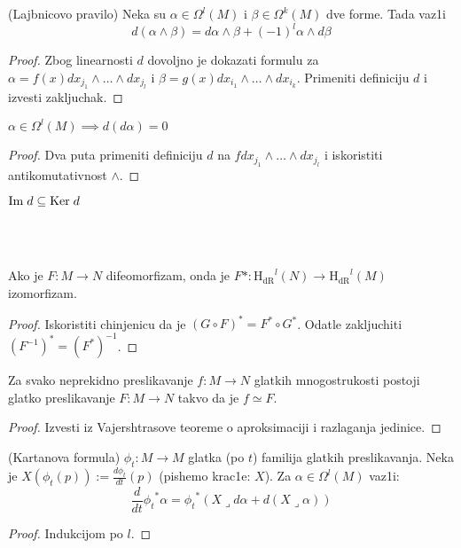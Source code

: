 \documentclass[a4paper,12pt]{article}
\newcommand{\psj}{\subseteq}
\newcommand{\hdr}[1]{{\mathrm{H_{dR}}}^{#1}}
\begin{document}
\begin{tvr} (Lajbnicovo pravilo)
Neka su $\alpha \in \Omega^l(M)$ i $\beta \in \Omega^k(M)$ dve forme. Tada vaz1i 
\[d(\alpha \wedge \beta) = d \alpha \wedge \beta + (-1)^l \alpha \wedge d \beta \]
\end{tvr}
\begin{proof}
Zbog linearnosti $d$ dovoljno je dokazati formulu za $\alpha = f(x) dx_{j_1} \wedge \dots \wedge dx_{j_l}$ i $\beta = g(x) dx_{i_1} \wedge \dots \wedge dx_{i_k}$. Primeniti definiciju $d$ i izvesti zakljuchak.
\end{proof}

\begin{tma} 
$\alpha \in \Omega^l(M) \implies d(d \alpha) = 0$
\end{tma}

\begin{proof}
Dva puta primeniti definiciju $d$ na $f dx_{j_1}\wedge \dots \wedge dx_{j_l} $ i iskoristiti anti\-ko\-mu\-ta\-tiv\-nost $\wedge$.
\end{proof}

\begin{posl}
$\mathrm{Im} \hspace{0.1cm} d \psj \mathrm{Ker} \hspace{0.1cm} d$
\end{posl}
\\ \\
\begin{tvr}
Ako je $F: M \to N$ difeomorfizam, onda je $F* : \hdr{l} (N) \to \hdr{l} (M)$ izomorfizam.
\end{tvr}

\begin{proof}
Iskoristiti chinjenicu da je ${(G \circ F)}^* = F^* \circ G^*$. Odatle zakljuchiti ${(F^{-1})}^* = {(F^*)}^{-1}$.
\end{proof}

\begin{tvr}
Za svako neprekidno preslikavanje $f: M \to N$ glatkih mnogostrukosti postoji glatko preslikavanje $F:M \to N$ takvo da je $f \simeq F$.
\end{tvr}

\begin{proof}
Izvesti iz Vajershtrasove teoreme o aproksimaciji i razlaganja jedinice. 
\end{proof}

\begin{tvr}
(Kartanova formula) $\phi_t : M \to M$ glatka (po $t$) familija glatkih pre\-sli\-ka\-va\-nja. Neka je $X(\phi_t(p)) := \frac{d \phi_t}{dt} (p)$ (pishemo krac1e: $X$). Za $\alpha \in \Omega^l(M)$ vaz1i:
\[\frac{d}{dt} {\phi_t}^* \alpha = {\phi_t}^*(X \lrcorner d \alpha + d(X \lrcorner \alpha))\]
\end{tvr}
\begin{proof}
Indukcijom po $l$.
\end{proof}
\end{document}
